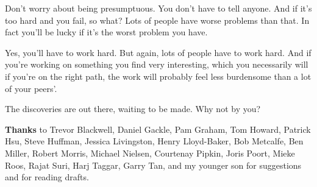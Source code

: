 Don't worry about being presumptuous. You don't have to tell anyone. And
if it's too hard and you fail, so what? Lots of people have worse
problems than that. In fact you'll be lucky if it's the worst problem
you have.

Yes, you'll have to work hard. But again, lots of people have to work
hard. And if you're working on something you find very interesting,
which you necessarily will if you're on the right path, the work will
probably feel less burdensome than a lot of your peers'.

The discoveries are out there, waiting to be made. Why not by you?


\textbf{Thanks} to Trevor Blackwell, Daniel Gackle, Pam Graham, Tom
Howard, Patrick Hsu, Steve Huffman, Jessica Livingston, Henry
Lloyd-Baker, Bob Metcalfe, Ben Miller, Robert Morris, Michael Nielsen,
Courtenay Pipkin, Joris Poort, Mieke Roos, Rajat Suri, Harj Taggar,
Garry Tan, and my younger son for suggestions and for reading drafts.